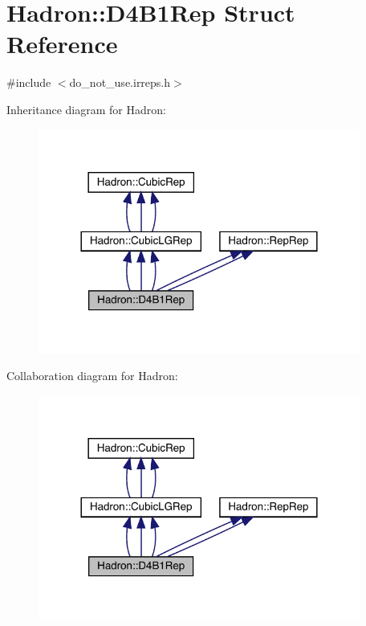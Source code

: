 \hypertarget{structHadron_1_1D4B1Rep}{}\section{Hadron\+:\+:D4\+B1\+Rep Struct Reference}
\label{structHadron_1_1D4B1Rep}


{\ttfamily \#include $<$do\+\_\+not\+\_\+use.\+irreps.\+h$>$}



Inheritance diagram for Hadron\+:
\nopagebreak
\begin{figure}[H]
\begin{center}
\leavevmode
\includegraphics[width=300pt]{db/d76/structHadron_1_1D4B1Rep__inherit__graph}
\end{center}
\end{figure}


Collaboration diagram for Hadron\+:
\nopagebreak
\begin{figure}[H]
\begin{center}
\leavevmode
\includegraphics[width=300pt]{dc/def/structHadron_1_1D4B1Rep__coll__graph}
\end{center}
\end{figure}

